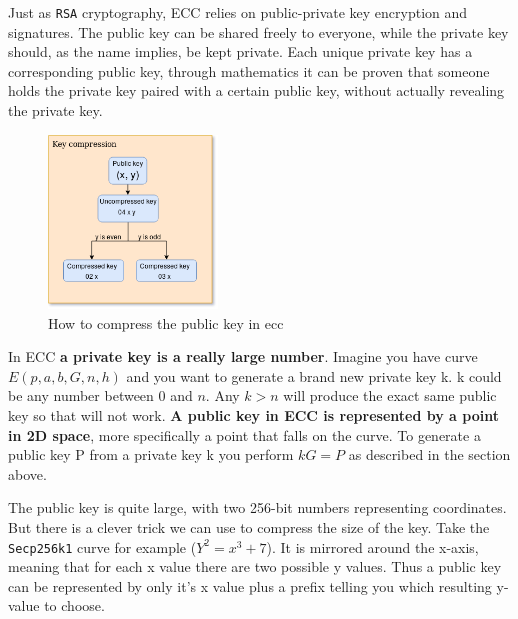 Just as \texttt{RSA} cryptography, ECC relies on public-private key encryption and signatures. 
The public key can be shared freely to everyone, while the private key should, as the name implies, 
be kept private. Each unique private key has a corresponding public key, through mathematics it 
can be proven that someone holds the private key paired with a certain public key, without actually 
revealing the private key.\cite{antonopoulos_2017}\cite{Secp256k1_def}

\begin{figure}
	\begin{center}
		\includegraphics[width=0.4\textwidth]{background/images/key_compression.png}
	\end{center}
	\vspace{-8mm}
	\caption{How to compress the public key in ecc}
\end{figure}

In ECC \textbf{a private key is a really large number}. Imagine you have curve $E(p,a,b,G,n,h)$ 
and you want to generate a brand new private key k. k could be any number between 0 and $n$. Any 
$k > n$ will produce the exact same public key so that will not work. \textbf{A public key in ECC is 
represented by a point in 2D space}, more specifically a point that falls on the curve.\cite{antonopoulos_2017} To generate a 
public key P from a private key k you perform $kG = P$ as described in the section above.\cite{ecc_def}\cite{Secp256k1_def}

The public key is quite large, with two 256-bit numbers representing coordinates. But there is a 
clever trick we can use to compress the size of the key. Take the \texttt{Secp256k1} curve for 
example ($Y^2=x^3+7$). It is mirrored around the x-axis, meaning that for each x value there 
are two possible y values. Thus a public key can be represented by only it's x value plus a 
prefix telling you which resulting y-value to choose.\cite{antonopoulos_2017}

